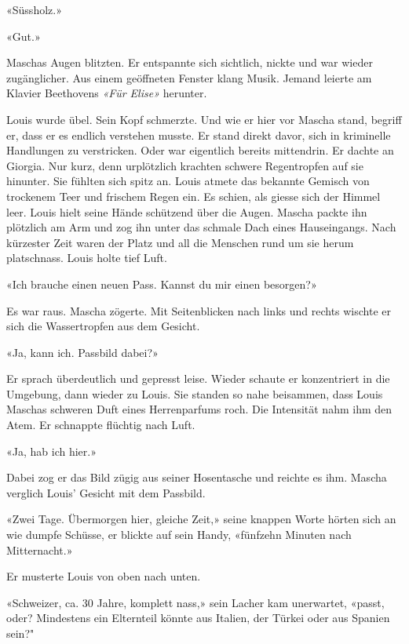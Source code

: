 «Süssholz.»

«Gut.»

Maschas Augen blitzten. Er entspannte sich sichtlich, nickte und war
wieder zugänglicher.
Aus einem geöffneten Fenster klang Musik.
Jemand leierte am Klavier Beethovens \emph{«Für Elise»} herunter.


Louis wurde übel. Sein Kopf schmerzte. Und wie er hier vor Mascha stand,
begriff er, dass er es endlich verstehen musste. Er stand direkt davor,
sich in kriminelle Handlungen zu verstricken. Oder war eigentlich
bereits mittendrin. Er dachte an Giorgia. Nur kurz, denn urplötzlich
krachten schwere Regentropfen auf sie hinunter. Sie fühlten sich spitz
an. Louis atmete das bekannte Gemisch von trockenem Teer und frischem
Regen ein. Es schien, als giesse sich der Himmel leer. Louis hielt seine
Hände schützend über die Augen. Mascha packte ihn plötzlich am Arm und
zog ihn unter das schmale Dach eines Hauseingangs. Nach kürzester Zeit
waren der Platz und all die Menschen rund um sie herum platschnass.
Louis holte tief Luft.

«Ich brauche einen neuen Pass. Kannst du mir einen besorgen?»

Es war raus. Mascha zögerte. Mit Seitenblicken nach links und rechts
wischte er sich die Wassertropfen aus dem Gesicht.

«Ja, kann ich. Passbild dabei?»

Er sprach überdeutlich und gepresst leise. Wieder schaute er konzentriert in die Umgebung, dann wieder zu Louis.
Sie standen so nahe beisammen, dass Louis Maschas schweren Duft eines
Herrenparfums roch. Die Intensität nahm ihm den Atem. Er schnappte
flüchtig nach Luft.

«Ja, hab ich hier.»

Dabei zog er das Bild zügig aus seiner Hosentasche und reichte es ihm.
Mascha verglich Louis’ Gesicht mit dem Passbild.

«Zwei Tage. Übermorgen hier, gleiche Zeit,» seine knappen Worte hörten
sich an wie dumpfe Schüsse, er blickte auf sein Handy, «fünfzehn Minuten nach Mitternacht.»

Er musterte Louis von oben nach unten.

«Schweizer, ca. 30 Jahre, komplett nass,» sein Lacher kam unerwartet,
«passt, oder? Mindestens ein Elternteil könnte aus Italien, der Türkei
oder aus Spanien sein?"


